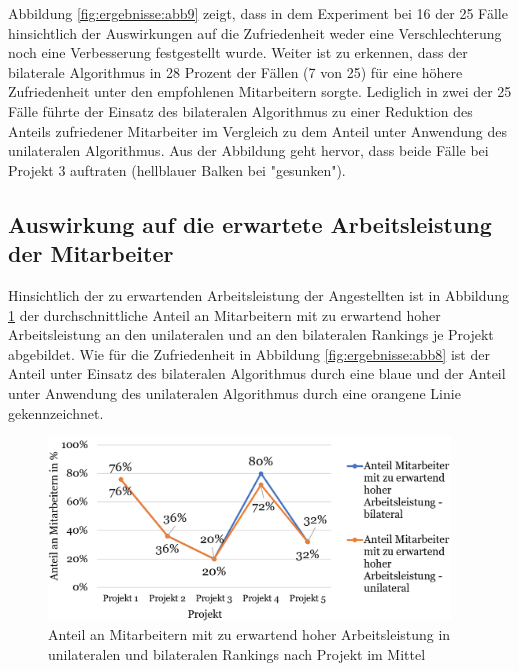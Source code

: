 Abbildung \ref{fig:ergebnisse:abb9} zeigt, dass in dem Experiment bei 16 der 25 Fälle hinsichtlich der Auswirkungen auf die Zufriedenheit weder eine Verschlechterung noch eine Verbesserung festgestellt wurde.
Weiter ist zu erkennen, dass der bilaterale Algorithmus in 28 Prozent der Fällen (7 von 25) für eine höhere Zufriedenheit unter den empfohlenen Mitarbeitern sorgte.
Lediglich in zwei der 25 Fälle führte der Einsatz des bilateralen Algorithmus zu einer Reduktion des Anteils zufriedener Mitarbeiter im Vergleich zu dem Anteil unter Anwendung des unilateralen Algorithmus.
Aus der Abbildung geht hervor, dass beide Fälle bei Projekt 3 auftraten (hellblauer Balken bei "gesunken").


\newpage
\subsection{Auswirkung auf die erwartete Arbeitsleistung der Mitarbeiter}
Hinsichtlich der zu erwartenden Arbeitsleistung der Angestellten ist in Abbildung \ref{fig:ergebnisse:abb10} der durchschnittliche Anteil an Mitarbeitern mit zu erwartend hoher Arbeitsleistung an den unilateralen und an den bilateralen Rankings je Projekt abgebildet.
Wie für die Zufriedenheit in Abbildung \ref{fig:ergebnisse:abb8} ist der Anteil unter Einsatz des bilateralen Algorithmus durch eine blaue und der Anteil unter Anwendung des unilateralen Algorithmus durch eine orangene Linie gekennzeichnet.

\begin{figure}[H]
    \centering
	\includegraphics[width=0.95\textwidth]{gfx/verhaeltnis-a-durchschnitt-projekte.png}
	\caption[Anteil an Mitarbeitern mit zu erwartend hoher Arbeitsleistung in unilateralen und bilateralen Rankings nach Projekt im Mittel]{Anteil an Mitarbeitern mit zu erwartend hoher Arbeitsleistung in unilateralen und bilateralen Rankings nach Projekt im Mittel}
	\label{fig:ergebnisse:abb10}
\end{figure}

